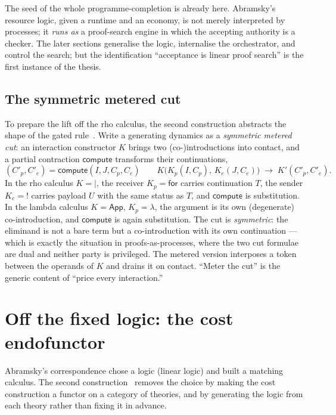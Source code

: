\documentclass[11pt]{article}
\theoremstyle{definition}
\theoremstyle{plain}
\begin{document}
The seed of the whole programme-completion is already here. Abramsky's resource
logic, given a runtime and an economy, is not merely interpreted by processes;
it \emph{runs as} a proof-search engine in which the accepting authority is a
checker. The later sections generalise the logic, internalise the orchestrator,
and control the search; but the identification ``acceptance is linear proof
search'' is the first instance of the thesis.

\subsection{The symmetric metered cut}

To prepare the lift off the rho calculus, the second construction abstracts the
shape of the gated rule~\cite{NoteII}. Write a generating dynamics as a
\emph{symmetric metered cut}: an interaction constructor $K$ brings two
(co-)introductions into contact, and a partial contraction $\mathsf{compute}$
transforms their continuations,
\[
  (C'_p, C'_e) = \mathsf{compute}(I, J, C_p, C_e)
  \qquad
  K\big(K_p(I,C_p),\, K_e(J,C_e)\big)
  \;\longrightarrow\;
  K'(C'_p, C'_e).
  \tag{$\dagger$}
\]
In the rho calculus $K = {\mid}$, the receiver $K_p = \mathsf{for}$ carries
continuation $T$, the sender $K_e = {!}$ carries payload $U$ with the same
status as $T$, and $\mathsf{compute}$ is substitution. In the lambda calculus
$K = \mathsf{App}$, $K_p = \lambda$, the argument is its own (degenerate)
co-introduction, and $\mathsf{compute}$ is again substitution. The cut is
\emph{symmetric}: the eliminand is not a bare term but a co-introduction with its
own continuation --- which is exactly the situation in proofs-as-processes,
where the two cut formulae are dual and neither party is privileged. The metered
version interposes a token between the operands of $K$ and drains it on contact.
``Meter the cut'' is the generic content of ``price every interaction.''

\section{Off the fixed logic: the cost endofunctor}\label{sec:functor}

Abramsky's correspondence chose a logic (linear logic) and built a matching
calculus. The second construction~\cite{NoteII} removes the choice by making
the cost construction a functor on a category of theories, and by generating the
logic from each theory rather than fixing it in advance.
\end{document}
